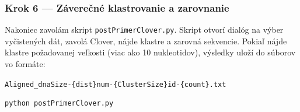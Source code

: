 \subsubsection*{Krok 6 — Záverečné klastrovanie a zarovnanie}
Nakoniec zavolám skript \texttt{postPrimerClover.py}. Skript otvorí dialóg na výber vyčistených dát, zavolá Clover, nájde klastre a zarovná sekvencie. Pokiaľ nájde klastre požadovanej veľkosti (viac ako 10 nukleotidov), výsledky uloží do súborov vo formáte:
\begin{center}
\texttt{Aligned\_dnaSize-\{dist\}num-\{ClusterSize\}id-\{count\}.txt}
\end{center}
\begin{verbatim}
python postPrimerClover.py
\end{verbatim}
